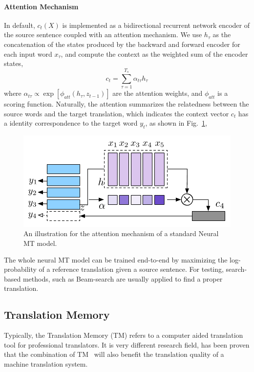 \documentclass[11pt,letterpaper]{article}
\begin{document}
\paragraph{Attention Mechanism}
In default, $c_t(X)$ is implemented as a bidirectional recurrent network encoder of the source sentence coupled with an attention mechanism. We use $h_\tau$ as the concatenation of the states produced by the backward and forward encoder for each input word $x_\tau$, and compute the context as the weighted sum of the encoder states,
\begin{equation}
\label{eq.attention}
c_t = \sum_{\tau=1}^{T_s}\alpha_{t\tau}h_\tau
\end{equation}
where $\alpha_{t\tau} \propto \exp\left[\phi_{att}\left(h_\tau, z_{t-1}\right)\right]$ are the attention weights, and $\phi_{att}$ is a scoring function. Naturally, the attention summarizes the relatedness between the source words and the target translation, which indicates the context vector $c_t$ has a identity correspondence to the target word $y_t$, as shown in Fig.~\ref{fig.nmt}, 
\begin{figure}[htbp]
\centering
\includegraphics[width=0.85\linewidth]{figures/nmt1.pdf}
\caption{\label{fig.nmt}An illustration for the attention mechanism of a standard Neural MT model.  }
\end{figure}

The whole neural MT model can be trained end-to-end by maximizing the log-probability of a reference translation given a source sentence. For testing, search-based methods, such as Beam-search are usually applied to find a proper translation.
\subsection{Translation Memory}
Typically, the Translation Memory (TM) refers to a computer aided translation tool for professional translators.
It is very different research field, has been proven that the combination of TM~\cite{li2016phrase} will also benefit the translation quality of a machine translation system.
\end{document}

